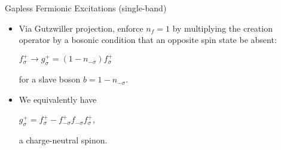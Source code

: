 \documentclass{beamer}
\begin{document}

    
    




    
    




\begin{frame}{Gapless Fermionic Excitations (single-band)}

    \begin{itemize}
        \item Via Gutzwiller projection, enforce $n_f=1$ by multiplying the creation operator by a bosonic condition that an opposite spin state be absent: 
        \begin{center}
            $f_{\sigma}^+ \to g_{\sigma}^+ = (1-n_{-\sigma})f_{\sigma}^+$
        \end{center}
        for a slave boson $b = 1-n_{-\sigma}$. 
        
        \item We equivalently have
        \begin{center}
            $g_{\sigma}^+ = f_{\sigma}^+ - f_{-\sigma}^+f_{-\sigma}f_{\sigma}^+$,
        \end{center}
        a charge-neutral spinon.
    \end{itemize}
    
\end{frame}
\end{document}
